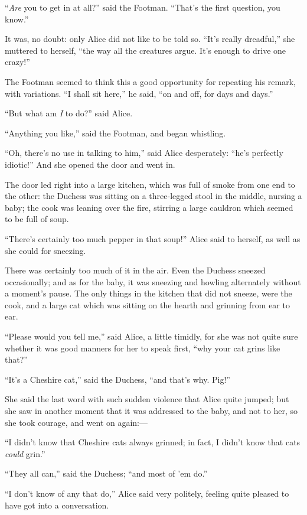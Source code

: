 \documentclass[11pt,openany,oneside]{book}
\begin{document}
“{\em Are\/} you to get in at all?” said the Footman. “That’s the first question, you know.” 

It was, no doubt: only Alice did not like to be told so. “It’s really dreadful,” she muttered to herself, “the way all the creatures argue. It’s enough to drive one crazy!” 

The Footman seemed to think this a good opportunity for repeating his remark, with variations. “I shall sit here,” he said, “on and off, for days and days.” 

“But what am {\em I\/} to do?” said Alice. 

“Anything you like,” said the Footman, and began whistling. 

“Oh, there’s no use in talking to him,” said Alice desperately: “he’s perfectly idiotic!” And she opened the door and went in. 

The door led right into a large kitchen, which was full of smoke from one end to the other: the Duchess was sitting on a three-legged stool in the middle, nursing a baby; the cook was leaning over the fire, stirring a large cauldron which seemed to be full of soup. 

“There’s certainly too much pepper in that soup!” Alice said to herself, as well as she could for sneezing. 

There was certainly too much of it in the air. Even the Duchess sneezed occasionally; and as for the baby, it was sneezing and howling alternately without a moment’s pause. The only things in the kitchen that did not sneeze, were the cook, and a large cat which was sitting on the hearth and grinning from ear to ear. 

“Please would you tell me,” said Alice, a little timidly, for she was not quite sure whether it was good manners for her to speak first, “why your cat grins like that?” 

“It’s a Cheshire cat,” said the Duchess, “and that’s why. Pig!” 

She said the last word with such sudden violence that Alice quite jumped; but she saw in another moment that it was addressed to the baby, and not to her, so she took courage, and went on again:— 

“I didn’t know that Cheshire cats always grinned; in fact, I didn’t know that cats {\em could\/} grin.” 

“They all can,” said the Duchess; “and most of ’em do.” 

“I don’t know of any that do,” Alice said very politely, feeling quite pleased to have got into a conversation. 
\end{document}
